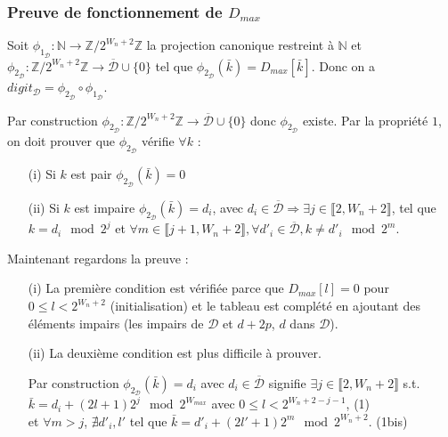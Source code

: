 \documentclass[12pt, a4paper]{memoir}
\begin{document}
\subsubsection{Preuve de fonctionnement de \emph{$D_{max}$}}

\begin{Proposition}
 Soit $\phi_{1_\mathcal{D}} : \mathbb{N} \rightarrow \mathbb{Z} / 2^{W_n+2} \mathbb{Z}$ la projection canonique restreint à $\mathbb{N}$
 et $\phi_{2_\mathcal{D}} : \mathbb{Z} / 2^{W_n+2} \mathbb{Z} \rightarrow \overline{\mathcal{D}} \cup \{0\}$ tel que $\phi_{2_\mathcal{D}}(\bar{k}) = D_{max}[\bar{k}]$.
 Donc on a $digit_{\mathcal{D}} = \phi_{2_\mathcal{D}} \circ \phi_{1_\mathcal{D}}$.
\end{Proposition}

\begin{Preuve}
 Par construction $\phi_{2_\mathcal{D}} : \mathbb{Z} / 2^{W_n+2} \mathbb{Z} \rightarrow \overline{\mathcal{D}} \cup \{0\}$ donc $\phi_{2_\mathcal{D}}$ existe.
 Par la propriété $1$, on doit prouver que $\phi_{2_\mathcal{D}}$ vérifie $\forall k$ : \\
 \begin{itemize}
  \item [(i)] Si $k$ est pair $\phi_{2_\mathcal{D}}(\bar{k}) = 0$
  \item [(ii)] Si $k$ est impaire $\phi_{2_\mathcal{D}}(\bar{k}) = d_i$, avec $d_i \in \overline{\mathcal{D}} 
  \Rightarrow \exists j \in \llbracket 2,W_n+2 \rrbracket$,
 tel que $k = d_i \mod 2^j$ et $\forall m \in \llbracket j+1,W_n+2 \rrbracket, \forall d'_i \in \overline{\mathcal{D}}, k \neq d'_i \mod 2^m$.
 \end{itemize}
 
 Maintenant regardons la preuve :
 \begin{itemize}
  \item [(i)] La première condition est vérifiée parce que $D_{max}[l] = 0$ pour $0 \leq l < 2^{W_n+2}$ (initialisation) et le tableau est complété en ajoutant des éléments impairs (les impairs de $\mathcal{D}$ et $d+2p$, $d$ dans $\mathcal{D}$).
  \item [(ii)] La deuxième condition est plus difficile à prouver.
  
  Par construction $\phi_{2_\mathcal{D}}(\bar{k}) = d_i$ avec $d_i \in \overline{\mathcal{D}}$ signifie
  $\exists j \in \llbracket 2,W_n+2 \rrbracket$ s.t. $\bar{k} = d_i + (2l+1)2^j \mod 2^{W_{max}}$ avec $0 \leq l < 2^{W_n+2-j-1}$, (1) \\
  et $\forall m > j$, $\nexists d'_i, l'$ tel que $\bar{k} = d'_i + (2l'+1)2^m \mod 2^{W_n+2}$. (1bis) \\
 \end{itemize}
  \vspace{0.3cm}
  

\end{Preuve}
\end{document}
